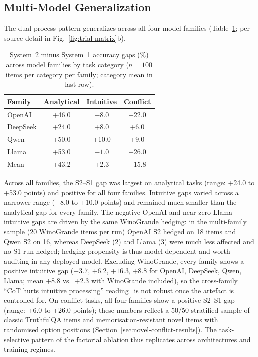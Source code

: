 \documentclass[conference]{IEEEtran}
\begin{document}
\subsection{Multi-Model Generalization}
\label{sec:multimodel-results}

The dual-process pattern generalizes across all four model families (Table~\ref{tab:multimodel}; per-source detail in Fig.~\ref{fig:trial-matrix}b).

\begin{table}[t]
\caption{System~2 minus System~1 accuracy gaps (\%) across model families by task category ($n = 100$ items per category per family; category mean in last row).}
\label{tab:multimodel}
\centering
\begin{tabular}{lccc}
\toprule
Family & Analytical & Intuitive & Conflict \\
\midrule
OpenAI & +46.0 & $-8.0$ & +22.0 \\
DeepSeek & +24.0 & +8.0 & +6.0 \\
Qwen & +50.0 & +10.0 & +9.0 \\
Llama & +53.0 & $-1.0$ & +26.0 \\
\midrule
Mean & +43.2 & +2.3 & +15.8 \\
\bottomrule
\end{tabular}
\end{table}

Across all families, the S2--S1 gap was largest on analytical tasks (range:
+24.0 to +53.0 points) and positive for all four families. Intuitive gaps varied across a narrower range ($-8.0$ to +10.0 points) and remained much smaller than the analytical gap for every family. The negative OpenAI and near-zero Llama intuitive gaps are driven by the same WinoGrande hedging: in the multi-family sample (20 WinoGrande items per run) OpenAI S2 hedged on 18 items and Qwen S2 on 16, whereas DeepSeek (2) and Llama (3) were much less affected and no S1 run hedged; hedging propensity is thus model-dependent and worth auditing in any deployed model. Excluding WinoGrande, every family shows a positive intuitive gap ($+3.7$, $+6.2$, $+16.3$, $+8.8$ for OpenAI, DeepSeek, Qwen, Llama; mean $+8.8$ vs.\ $+2.3$ with WinoGrande included), so the cross-family ``CoT hurts intuitive processing'' reading~\cite{Liu2024} is not robust once the artefact is controlled for. On conflict tasks, all four families show a positive S2--S1 gap (range: +6.0 to +26.0 points); these numbers reflect a 50/50 stratified sample of classic TruthfulQA items and memorisation-resistant novel items with randomised option positions (Section~\ref{sec:novel-conflict-results}). The task-selective pattern of the factorial ablation thus replicates across architectures and training regimes.
\end{document}
